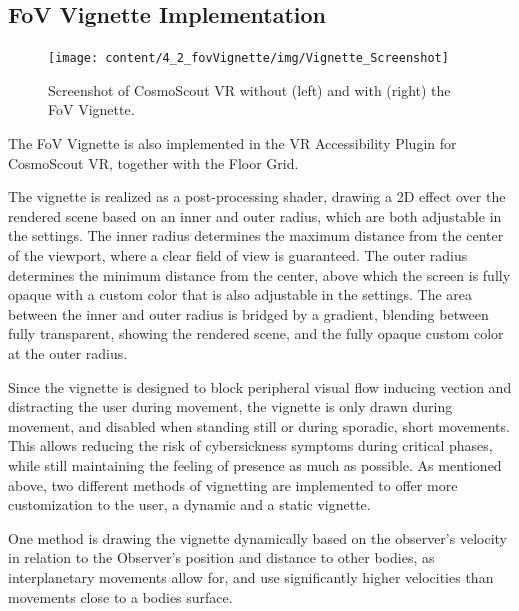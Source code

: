 \subsection{FoV Vignette Implementation}\label{subsec:fov-vignette-implementation}

\begin{figure}[h]
    \centering
    \texttt{[image: content/4\_2\_fovVignette/img/Vignette\_Screenshot]}
    \caption{Screenshot of CosmoScout VR without (left) and with (right) the FoV Vignette.}
    \label{fig:fov-vignette-screenshot}
\end{figure}

The FoV Vignette is also implemented in the VR Accessibility Plugin for CosmoScout VR, together with the Floor Grid.

The vignette is realized as a post-processing shader, drawing a 2D effect over the rendered scene based on an
inner and outer radius, which are both adjustable in the settings.
The inner radius determines the maximum distance from the center of the viewport, where a clear field of view is
guaranteed.
The outer radius determines the minimum distance from the center, above which the screen is fully opaque with a custom
color that is also adjustable in the settings.
The area between the inner and outer radius is bridged by a gradient, blending between fully transparent, showing the
rendered scene, and the fully opaque custom color at the outer radius.

Since the vignette is designed to block peripheral visual flow inducing vection and distracting the user during
movement, the vignette is only drawn during movement, and disabled when standing still or during sporadic, short
movements.
This allows reducing the risk of cybersickness symptoms during critical phases, while still maintaining the feeling
of presence as much as possible.
As mentioned above, two different methods of vignetting are implemented to offer more customization to the user, a
dynamic and a static vignette.

One method is drawing the vignette dynamically based on the observer's velocity in relation to the Observer's
position and distance to other bodies, as interplanetary movements allow for, and use significantly higher
velocities than movements close to a bodies surface.

